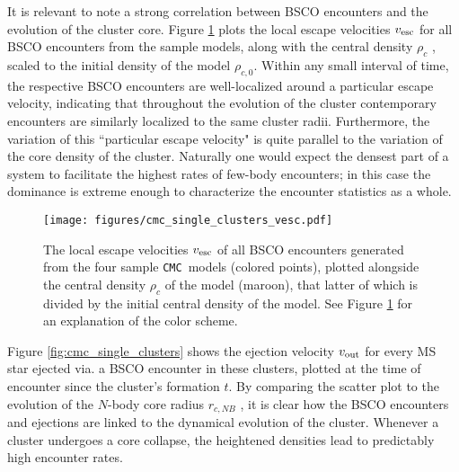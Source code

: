 \documentclass[twocolumn]{aastex631}
\newcommand{\CMC}{\texttt{CMC}}
\begin{document}
It is relevant to note a strong correlation between BSCO encounters and the evolution of the cluster core.
Figure \ref{fig:cmc_single_clusters_vesc} plots the local escape velocities $v_{\rm esc}$ for all BSCO encounters from the sample models, along with the central density $\rho_c$ \citep{1985ApJ...298...80C}, scaled to the initial density of the model $\rho_{c,0}$.
Within any small interval of time, the respective BSCO encounters are well-localized around a particular escape velocity, indicating that throughout the evolution of the cluster contemporary encounters are similarly localized to the same cluster radii.
Furthermore, the variation of this ``particular escape velocity" is quite parallel to the variation of the core density of the cluster.
Naturally one would expect the densest part of a system to facilitate the highest rates of few-body encounters; in this case the dominance is extreme enough to characterize the encounter statistics as a whole.

\begin{figure}
    \centering
    \texttt{[image: figures/cmc\_single\_clusters\_vesc.pdf]}
    \caption{
        The local escape velocities $v_{\rm esc}$ of all BSCO encounters generated from the four sample \CMC\ models (colored points), plotted alongside the central density $\rho_c$ of the model (maroon), that latter of which is divided by the initial central density of the model.
        See Figure \ref{fig:cmc_single_clusters_vesc} for an explanation of the color scheme.
    }
    \label{fig:cmc_single_clusters_vesc}
\end{figure}

Figure \ref{fig:cmc_single_clusters} shows the ejection velocity $v_{\rm out}$ for every MS star ejected via. a BSCO encounter in these clusters, plotted at the time of encounter since the cluster's formation $t$.
By comparing the scatter plot to the evolution of the $N$-body core radius $r_{c, NB}$ \citep{1985ApJ...298...80C}, it is clear how the BSCO encounters and ejections are linked to the dynamical evolution of the cluster.
Whenever a cluster undergoes a core collapse, the heightened densities lead to predictably high encounter rates.
\end{document}
